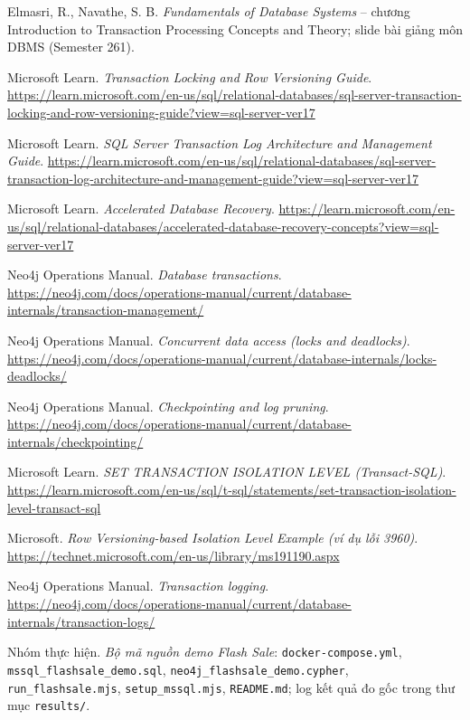 \begin{enumerate}[label={[\arabic*]}, leftmargin=*, itemsep=2pt]
    \item Elmasri, R., Navathe, S. B. \textit{Fundamentals of Database Systems} -- chương Introduction to Transaction Processing Concepts and Theory; slide bài giảng môn DBMS (Semester 261).
    \item Microsoft Learn. \textit{Transaction Locking and Row Versioning Guide}. \url{https://learn.microsoft.com/en-us/sql/relational-databases/sql-server-transaction-locking-and-row-versioning-guide?view=sql-server-ver17}
    \item Microsoft Learn. \textit{SQL Server Transaction Log Architecture and Management Guide}. \url{https://learn.microsoft.com/en-us/sql/relational-databases/sql-server-transaction-log-architecture-and-management-guide?view=sql-server-ver17}
    \item Microsoft Learn. \textit{Accelerated Database Recovery}. \url{https://learn.microsoft.com/en-us/sql/relational-databases/accelerated-database-recovery-concepts?view=sql-server-ver17}
    \item Neo4j Operations Manual. \textit{Database transactions}. \url{https://neo4j.com/docs/operations-manual/current/database-internals/transaction-management/}
    \item Neo4j Operations Manual. \textit{Concurrent data access (locks and deadlocks)}. \url{https://neo4j.com/docs/operations-manual/current/database-internals/locks-deadlocks/}
    \item Neo4j Operations Manual. \textit{Checkpointing and log pruning}. \url{https://neo4j.com/docs/operations-manual/current/database-internals/checkpointing/}
    \item Microsoft Learn. \textit{SET TRANSACTION ISOLATION LEVEL (Transact-SQL)}. \url{https://learn.microsoft.com/en-us/sql/t-sql/statements/set-transaction-isolation-level-transact-sql}
    \item Microsoft. \textit{Row Versioning-based Isolation Level Example (ví dụ lỗi 3960)}. \url{https://technet.microsoft.com/en-us/library/ms191190.aspx}
    \item Neo4j Operations Manual. \textit{Transaction logging}. \url{https://neo4j.com/docs/operations-manual/current/database-internals/transaction-logs/}
    \item Nhóm thực hiện. \textit{Bộ mã nguồn demo Flash Sale}: \texttt{docker-compose.yml}, \texttt{mssql\_flashsale\_demo.sql}, \texttt{neo4j\_flashsale\_demo.cypher}, \texttt{run\_flashsale.mjs}, \texttt{setup\_mssql.mjs}, \texttt{README.md}; log kết quả đo gốc trong thư mục \texttt{results/}.
\end{enumerate}

